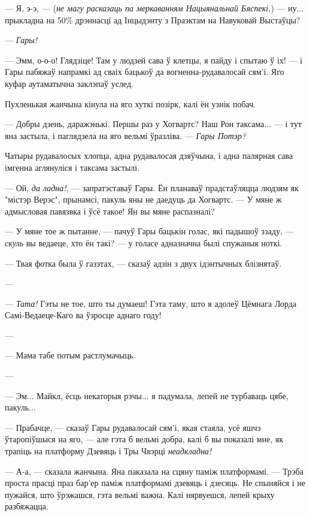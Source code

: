 --- Я, э-э, --- (\emph{не магу расказаць па меркаванням Нацыянальнай Бяспекі,}) ---
ну... прыкладна на 50\% дрэннасці ад Інцыдэнту з Праэктам на Навуковай Выстаўцы?

--- \emph{Гары!}

--- Эмм, о-о-о! Глядзіце! Там у людзей сава ў клетцы, я пайду і спытаю ў іх! --- 
і Гары пабяжаў напрамкі ад сваіх бацькоў да вогненна-рудавалосай сям'і. Яго 
куфар аутаматычна заклэпаў услед. 

Пухленькая жанчына кінула на яго хуткі позірк, калі ён узнік побач.

--- Добры дзень, даражэнькі. Першы раз у Хогвартс? 
Наш Рон таксама... --- і тут яна застыла, і паглядзела на яго вельмі ўразліва.
--- \emph{Гары Потэр?}

Чатыры рудавалосых хлопца, адна рудавалосая дзяўчына, і адна палярная сава 
імгенна аглянуліся і таксама застылі.

--- Ой, \emph{да ладна!}, --- запратэставаў Гары. Ён планаваў прадстаўляцца людзям
як "містэр Верэс", прынамсі, пакуль яны не даедуць да Хогвартс. --- У мяне ж
адмысловая павязвка і ўсё такое! Ян вы мяне распазналі?

--- У мяне тое ж пытанне, --- пачуў Гары бацькін голас, які падышоў 
ззаду, --- \emph{скуль} вы ведаеце, хто ён такі? --- 
у голасе адназначна былі спужаныя ноткі. 

--- Твая фотка была ў газэтах, --- сказаў адзін з двух ідэнтычных блізнятаў.

--- 

--- \emph{Тата!} Гэты не тое, што ты думаеш! Гэта таму, што я адолеў Цёмнага Лорда
Самі-Ведаеце-Каго ва ўзросце аднаго году!

--- 

--- Мама табе потым растлумачыць.

--- 

--- Эм... Майкл, ёсць некаторыя рэчы... я падумала, лепей не турбаваць цябе,
пакуль...

--- Прабачце, --- сказаў Гары рудавалосай сям'і, якая стаяла, усё яшчэ ўтаропіўшыся
на яго, --- але гэта б вельмі добра, калі б вы показалі мне, як трапіць
на платформу Дзевяць і Тры Чвэрці \emph{неадкладна!}

--- А-а, --- сказала жанчына. Яна паказала на сцяну паміж платформамі. --- 
Трэба проста прасці праз бар'ер паміж платформамі дзевяць і дзесяць. Не спыняйся
і не пужайся, што ўрэжашся, гэта вельмі важна. Калі нярвуешся, лепей крыху
разбяжацца.

